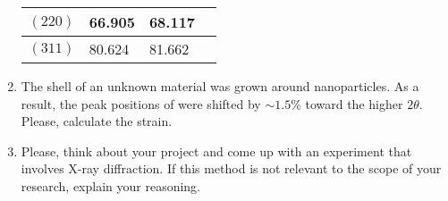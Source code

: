 \documentclass[../psets.tex]{subfiles}
\begin{document}
\begin{enumerate}
\begin{center}
\begin{tabular}{|l|l|l|l|}
            $(220)$ & \num{66.905} & \num{68.117} & \\ \hline
            $(311)$ & \num{80.624} & \num{81.662} & \\
            \hline
        \end{tabular}
    \end{center}
    \item The shell of an unknown material was grown around  nanoparticles. As a result, the peak positions of  were shifted by $\sim 1.5\%$ toward the higher $2\theta$. Please, calculate the strain.
    \item Please, think about your project and come up with an experiment that involves X-ray diffraction. If this method is not relevant to the scope of your research, explain your reasoning.
\end{enumerate}
\end{document}
